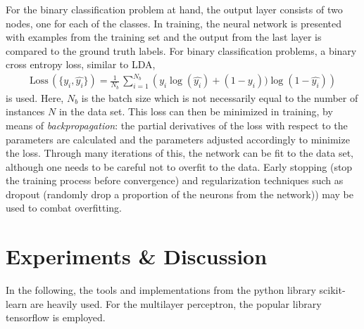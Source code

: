 \documentclass[12pt, a4paper]{scrartcl}
\begin{document}
For the binary classification problem at hand, the output layer consists of two nodes, one for each of the classes. In training, the neural network is presented with examples from the training set and the output from the last layer is compared to the ground truth labels. For binary classification problems, a binary cross entropy loss, similar to LDA,
\begin{align}
	\text{Loss}\, (\{y_i, \hat{y_i}\}) = \frac{1}{N_b} \, \sum_{i=1}^{N_b} \left( y_i \log(\hat{y_i}) + (1-y_i)) \log(1-\hat{y_i}) \right)
\end{align}
is used. Here, $N_b$ is the batch size which is not necessarily equal to the number of instances $N$ in the data set. This loss can then be minimized in training, by means of \emph{backpropagation}: the partial derivatives of the loss with respect to the parameters are calculated and the parameters adjusted accordingly to minimize the loss.
Through many iterations of this, the network can be fit to the data set, although one needs to be careful not to overfit to the data.
Early stopping (stop the training process before convergence) and regularization techniques such as dropout (randomly drop a proportion of the neurons from the network)) may be used to combat overfitting.

\section{Experiments \& Discussion}
\label{sec:expe}
In the following, the tools and implementations from the python library scikit-learn \cite{scikit-learn} are heavily used. For the multilayer perceptron, the popular library tensorflow \cite{tensorflow2015-whitepaper} is employed.
\end{document}
